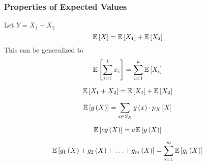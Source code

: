 \subsubsection{Properties of Expected Values}\label{subsubsec:Properties of Discrete Expected Value}
\begin{definition}\label{def:Linearity of Expectation}
  Let $Y = X_{1} + X_{2}$
  \begin{equation}
    \operatorname{\operatorname{\mathbb{E}}} \left[ X \right] = \operatorname{\operatorname{\mathbb{E}}} \left[ X_{1} \right] + \operatorname{\operatorname{\mathbb{E}}} \left[ X_{2} \right]
  \end{equation}
  This can be generalized to
  \begin{equation}\label{eq:General Linearity of Expectation}
    \operatorname{\operatorname{\mathbb{E}}} \left[ \sum_{i=1}^{k} x_{i} \right] = \sum_{i=1}^{k} \operatorname{\operatorname{\mathbb{E}}} \left[ X_{i} \right]
  \end{equation}
\end{definition}
\begin{propertylist}
\item
  \begin{equation}
    \operatorname{\operatorname{\mathbb{E}}} \left[ X_{1} + X_{2} \right] = \operatorname{\operatorname{\mathbb{E}}} \left[ X_{1} \right] + \operatorname{\operatorname{\mathbb{E}}} \left[ X_{2} \right]
  \end{equation}
\item
  \begin{equation}
    \operatorname{\operatorname{\mathbb{E}}} \left[ g \left( X \right) \right] = \sum\limits_{s \in S_{X}} g \left( x \right) \cdot p_{X} \left[ X \right]
  \end{equation}
\item
  \begin{equation}
    \operatorname{\operatorname{\mathbb{E}}} \left[ c g\left( X \right) \right] = c \operatorname{\operatorname{\mathbb{E}}} \left[ g\left( X \right) \right]
  \end{equation}
\item
  \begin{equation}
    \operatorname{\operatorname{\mathbb{E}}} \left[ g_{1} \left( X \right) + g_{2} \left( X \right) + \ldots + g_{m} \left( X \right) \right] = \sum\limits_{i=1}^{m} \operatorname{\operatorname{\mathbb{E}}} \left[ g_{i} \left( X \right) \right]
  \end{equation}
\end{propertylist}

